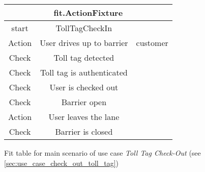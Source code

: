 
\begin{figure}[H]
\begin{centering}
\begin{tabular}{|c|c|c|}\hline 
\multicolumn{3}{|c|}{fit.ActionFixture}\tabularnewline
\hline
start & TollTagCheckIn & \tabularnewline
\hline
Action & User drives up to barrier & customer \tabularnewline\hline \hline 
Check & Toll tag detected & \tabularnewline\hline 
Check & Toll tag is authenticated & \tabularnewline\hline 
Check & User is checked out & \tabularnewline\hline 
Check & Barrier open\tabularnewline\hline 
Action & User leaves the lane\tabularnewline\hline 
Check & Barrier is closed\tabularnewline
\hline \end{tabular}

\caption{Fit table for main scenario of use case \emph{Toll Tag Check-Out} (see \autoref{sec:use_case_check_out_toll_tag})}
\end{centering}
\end{figure}